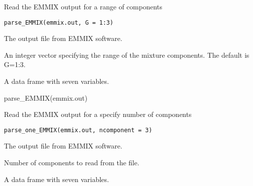 \documentclass[a4paper]{book}
\begin{document}
%
\begin{Description}\relax
Read the EMMIX output for a range of components
\end{Description}
%
\begin{Usage}
\begin{verbatim}
parse_EMMIX(emmix.out, G = 1:3)
\end{verbatim}
\end{Usage}
%
\begin{Arguments}
\begin{ldescription}
\item[\code{emmix.out}] The output file from EMMIX software.

\item[\code{G}] An integer vector specifying the range of the mixture components.
The default is G=1:3.
\end{ldescription}
\end{Arguments}
%
\begin{Value}
A data frame with seven variables.
\end{Value}
%
\begin{Examples}
\begin{ExampleCode}
parse_EMMIX(emmix.out)
\end{ExampleCode}
\end{Examples}
%
\begin{Description}\relax
Read the EMMIX output for a specify number of components
\end{Description}
%
\begin{Usage}
\begin{verbatim}
parse_one_EMMIX(emmix.out, ncomponent = 3)
\end{verbatim}
\end{Usage}
%
\begin{Arguments}
\begin{ldescription}
\item[\code{emmix.out}] The output file from EMMIX software.

\item[\code{ncomponent}] Number of components to read from the file.
\end{ldescription}
\end{Arguments}
%
\begin{Value}
A data frame with seven variables.
\end{Value}
\end{document}
